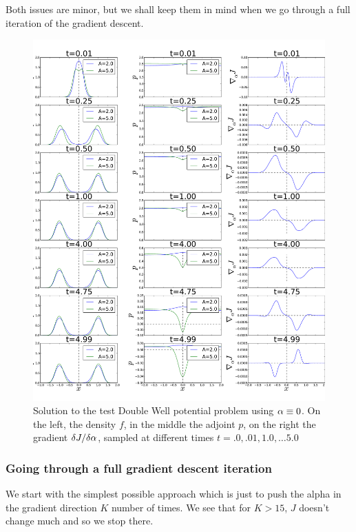 \documentclass{article}
\begin{document}
Both issues are minor, but we shall keep them in mind when we go through a full
iteration of the gradient descent. 
\begin{figure}[htp] 
\begin{center} 
  \includegraphics[width=\textwidth]{Figs/DoublewellFBSolver/FB_alpha_null_solution.pdf}
  \caption[labelInTOC]{Solution to the test Double Well potential problem using
  ${\alpha} \equiv 0$. On the left, the density $f$, in the middle the adjoint $p$, 
  on the right the gradient $\delta J/ \delta {\alpha}$, sampled at different times
  $t=.0, .01, 1.0,\ldots5.0$} 
  \label{fig:FBSoln_doublewell_alpha_null}
\end{center}
\end{figure}

 \clearpage

\subsubsection{Going through a full gradient descent iteration}
We start with the simplest possible approach which is just to push the alpha in
the gradient direction $K$ number of times. We see that for $K> 15$, $J$ doesn't
change much and so we stop there. 
\end{document}
